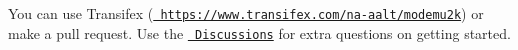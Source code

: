 You can use Transifex (\href{https://www.transifex.com/na-aalt/modemu2k}{\texttt{ https\+://www.\+transifex.\+com/na-\/aalt/modemu2k}}) or make a pull request. Use the \href{https://github.com/theimpossibleastronaut/modemu2k/discussions}{\texttt{ Discussions}} for extra questions on getting started. 